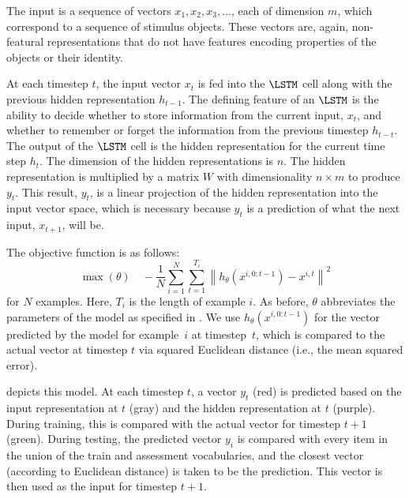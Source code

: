 The input is a sequence of vectors $x_1, x_2, x_3, \dots$, each of dimension $m$, which correspond to a sequence of stimulus objects. These vectors are, again, non-featural representations that do not have features encoding properties of the objects or their identity.

At each timestep $t$, the input vector $x_t$ is fed into the $\LSTM$ cell along with the previous hidden representation $h_{t-1}$. The defining feature of an $\LSTM$ is the ability to decide whether to store information from the current input, $x_t$, and whether to remember or forget the information from the previous timestep $h_{t-t}$. The output of the $\LSTM$ cell is the hidden representation for the current time step $h_t$. The dimension of the hidden representations is $n$. The hidden representation is multiplied by a matrix $W$ with dimensionality $n \times m$ to produce $y_t$. This result, $y_t$, is a linear projection of the hidden representation into the input vector space, which is necessary because $y_t$ is a prediction of what the next input, $x_{t+1}$, will be.

The objective function is as follows:
%
\begin{equation}
\max(\theta)
\quad
-\frac{1}{N}
\sum_{i=1}^{N}
\sum_{t=1}^{T_{i}}
\left\| h_{\theta}\left(x^{i, 0:{t-1}}\right) - x^{i,t} \right\|^{2}
\end{equation}
%
for $N$ examples. Here, $T_{i}$ is the length of example $i$. As before, $\theta$ abbreviates the parameters of the model as specified in . We use $h_{\theta}(x^{i, 0:{t-1}})$ for the vector predicted by the model for example~$i$ at timestep~$t$, which is compared to the actual vector at timestep $t$ via squared Euclidean distance (i.e., the mean squared error).

 depicts this model. At each timestep $t$, a vector $y_{t}$ (red) is predicted based on the input representation at $t$ (gray) and the hidden representation at $t$ (purple). During training, this is compared with the actual vector for timestep $t+1$ (green). During testing, the predicted vector $y_{i}$ is compared with every item in the union of the train and assessment vocabularies, and the closest vector (according to Euclidean distance) is taken to be the prediction. This vector is then used as the input for timestep $t+1$.




